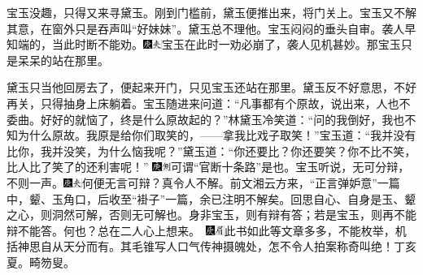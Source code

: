 宝玉没趣，只得又来寻黛玉。刚到门槛前，黛玉便推出来，将门关上。宝玉又不解其意，在窗外只是吞声叫``好妹妹''。黛玉总不理他。宝玉闷闷的垂头自审。袭人早知端的，当此时断不能劝。{\includegraphics[width=3mm]{../Images/00004}\includegraphics[width=3mm]{../Images/00012}\footnotesize \kaishu 宝玉在此时一劝必崩了，袭人见机甚妙。}那宝玉只是呆呆的站在那里。

黛玉只当他回房去了，便起来开门，只见宝玉还站在那里。黛玉反不好意思，不好再关，只得抽身上床躺着。宝玉随进来问道：``凡事都有个原故，说出来，人也不委曲。好好的就恼了，终是什么原故起的？''林黛玉冷笑道：``问的我倒好，我也不知为什么原故。我原是给你们取笑的，------拿我比戏子取笑！''宝玉道：``我并没有比你，我并没笑，为什么恼我呢？''黛玉道：``你还要比？你还要笑？你不比不笑，比人比了笑了的还利害呢！''{
\includegraphics[width=3mm]{../Images/00004}\includegraphics[width=3mm]{../Images/00011}\footnotesize \kaishu 可谓``官断十条路''是也。}宝玉听说，无可分辩，不则一声。{\includegraphics[width=3mm]{../Images/00004}\includegraphics[width=3mm]{../Images/00012}\footnotesize \kaishu 何便无言可辩？真令人不解。前文湘云方来，``正言弹妒意''一篇中，颦、玉角口，后收至``褂子''一篇，余已注明不解矣。回思自心、自身是玉、颦之心，则洞然可解，否则无可解也。身非宝玉，则有辩有答；若是宝玉，则再不能辩不能答。何也？总在二人心上想来。　{\includegraphics[width=3mm]{../Images/00004}\includegraphics[width=3mm]{../Images/00010}\footnotesize \kaishu 此书如此等文章多多，不能枚举，机括神思自从天分而有。其毛锥写人口气传神摄魄处，怎不令人拍案称奇叫绝！丁亥夏。畸笏叟。}}

